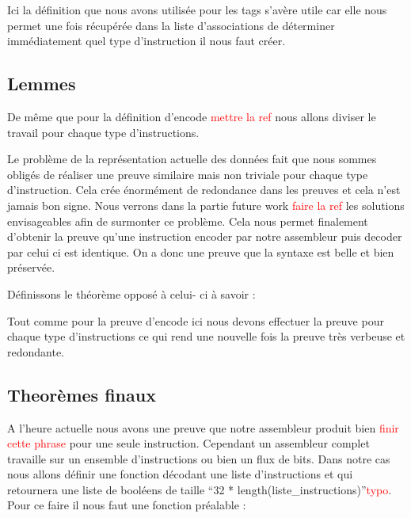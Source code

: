 \documentclass {article}
\newcommand{\codefrom}[3]
           {}
\theoremstyle{definition}
\theoremstyle{remark}
\newcommand{\todo}[1]{\textcolor{red}{#1}}
\begin{document}
Ici la définition que nous avons utilisée pour les tags s'avère utile car elle nous permet
une fois récupérée dans la liste d'associations de déterminer immédiatement quel type
d'instruction il nous faut créer.





\subsection{Lemmes}
\label{LemmesEncode}
De même que pour la définition d'encode \todo{mettre la ref} nous allons diviser le travail pour chaque
type d'instructions.

\codefrom{src}{encodeProof}{encode_decode_t_n}

Le problème de la représentation actuelle des données fait que nous sommes obligés de réaliser une preuve
similaire mais non triviale pour chaque type d'instruction. Cela crée énormément de redondance dans les preuves
et cela n'est jamais bon signe. Nous verrons dans la partie future work \todo{faire la ref} les solutions envisageables afin
de surmonter ce problème.
Cela nous permet finalement d'obtenir la preuve qu'une instruction encoder par notre assembleur puis decoder par celui
ci est identique. On a donc une preuve que la syntaxe est belle et bien préservée.

Définissons le théorème opposé à celui- ci à savoir :

\codefrom{src}{encodeProof}{decode_encode}

Tout comme pour la preuve d'encode ici nous devons effectuer la preuve pour chaque type d'instructions
ce qui rend une nouvelle fois la preuve très verbeuse et redondante. 




\subsection{Theorèmes finaux}

A l'heure actuelle nous avons une preuve que notre assembleur produit bien \todo{finir cette phrase}
pour une seule instruction. Cependant un assembleur complet travaille sur un ensemble d'instructions
ou bien un flux de bits. Dans notre cas nous allons définir une fonction décodant une liste d'instructions et qui
retournera une liste de booléens de taille ``32 * length(liste\_instructions)''\todo{typo}.
Pour ce faire il nous faut une fonction préalable :
\end{document}
